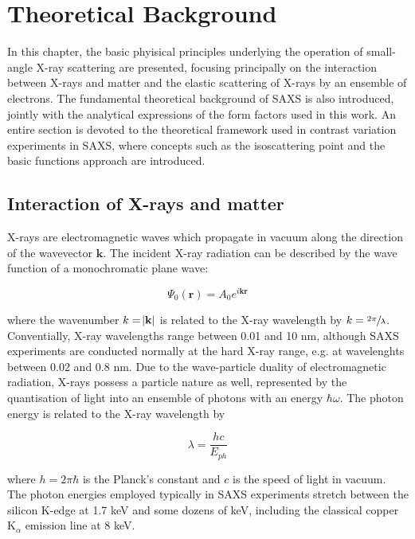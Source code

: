 \newcommand{\vect}[1]{\boldsymbol{\mathbf{#1}}}


\chapter{Theoretical Background}
\label{chap:theory_SAXS}
In this chapter, the basic phyisical principles underlying the operation of small-angle X-ray scattering are presented, focusing principally on the interaction between X-rays and matter and the elastic scattering of X-rays by an ensemble of electrons. The fundamental theoretical background of SAXS is also introduced, jointly with the analytical expressions of the form factors used in this work. An entire section is devoted to the theoretical framework used in contrast variation experiments in SAXS, where concepts such as the isoscattering point and the basic functions approach are introduced.

\section{Interaction of X-rays and matter}

X-rays are electromagnetic waves which propagate in vacuum along the direction of the wavevector $\vect{k}$. The incident X-ray radiation can be described by the wave function of a monochromatic plane wave:

\begin{equation}
        \label{eq:IncidentWave}
        \Psi_0\left( \vect{r} \right)=A_0 e^{i \vect{k}\vect{r} }
\end{equation}

where the wavenumber $k=\abs{\vect{k}}$ is related to the X-ray wavelength by $k=\sfrac{2\pi}{\lambda}$. Conventially, X-ray wavelengths range between 0.01 and 10 nm, although SAXS experiments are conducted normally at the hard X-ray range, e.g. at wavelenghts between 0.02 and 0.8 nm. Due to the wave-particle duality of electromagnetic radiation, X-rays possess a particle nature as well, represented by the quantisation of light into an ensemble of photons with an energy $\hbar \omega$. The photon energy is related to the X-ray wavelength by \citep{als-nielsen_elements_2011}

\begin{equation}
        \lambda = \frac{h c}{E_{ph}}
\end{equation}

where $h=2\pi\hbar$ is the Planck's constant and $c$ is the speed of light in vacuum. The photon energies employed typically in SAXS experiments stretch between the silicon K-edge at 1.7 keV and some dozens of keV, including the classical copper K$_{\alpha}$ emission line at 8 keV.

